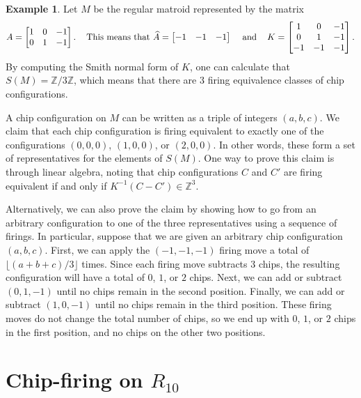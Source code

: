 \documentclass[12p]{amsart}
\numberwithin{equation}{section}
\theoremstyle{plain}
\theoremstyle{definition}
\newtheorem{example}[thm]{Example}
\newcommand{\Z}{\mathbb {Z}}
\begin{document}
\begin{example}
    Let $M$ be the regular matroid represented by the matrix 
    \[A = \begin{bmatrix} 1 & 0 & -1 \\ 0 & 1 & -1\end{bmatrix}.\hspace{ .3 cm} \text{ This means that } \widehat A = \begin{bmatrix} -1 & -1 & -1\end{bmatrix}\hspace{ .3 cm} \text{ and } \hspace{ .3 cm} K = \begin{bmatrix} 1 & 0 & -1 \\ 0 & 1 & -1 \\ -1 & -1 & -1\end{bmatrix}.\]
    By computing the Smith normal form of $K$, one can calculate that $S(M) = \Z/3\Z$, which means that there are 3 firing equivalence classes of chip configurations. 
    
    A chip configuration on $M$ can be written as a triple of integers $(a,b,c)$. We claim that each chip configuration is firing equivalent to exactly one of the configurations $(0,0,0)$, $(1,0,0)$, or $(2,0,0)$. In other words, these form a set of representatives for the elements of $S(M)$. One way to prove this claim is through linear algebra, noting that chip configurations $C$ and $C'$ are firing equivalent if and only if $K^{-1}(C-C') \in \Z^3$. 

    Alternatively, we can also prove the claim by showing how to go from an arbitrary configuration to one of the three representatives using a sequence of firings. In particular, suppose that we are given an arbitrary chip configuration $(a,b,c)$. First, we can apply the $(-1,-1,-1)$ firing move a total of $\lfloor(a+b+c)/3\rfloor$ times. Since each firing move subtracts 3 chips, the resulting configuration will have a total of $0$, $1$, or $2$ chips. Next, we can add or subtract $(0,1,-1)$ until no chips remain in the second position. Finally, we can add or subtract $(1,0,-1)$ until no chips remain in the third position. These firing moves do not change the total number of chips, so we end up with $0$, $1$, or $2$ chips in the first position, and no chips on the other two positions. 
\end{example}

\section{Chip-firing on $R_{10}$}\label{sec:R10} 
\end{document}
